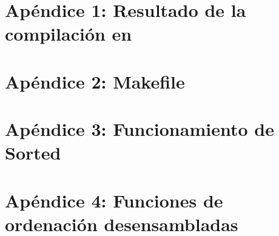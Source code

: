 \documentclass[a4paper,11pt]{book}
\begin{document}
\chapter{Apéndice 1: Resultado de la compilación en }\label{chap:apendice1}


\appendix
\chapter{Apéndice 2: Makefile}\label{chap:apendice2}


\appendix
\chapter{Apéndice 3: Funcionamiento de Sorted}\label{chap:apendice3}


\appendix
\chapter{Apéndice 4: Funciones de ordenación desensambladas}\label{chap:apendice4}

\end{document}
